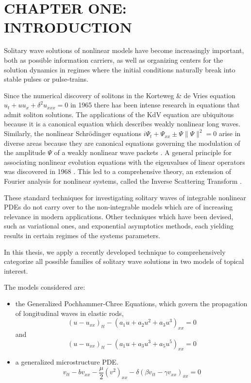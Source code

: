 \chapter{CHAPTER ONE: INTRODUCTION} \label{chapter_1}

Solitary wave solutions of nonlinear models have become increasingly
important, both as possible information carriers,
as well as organizing centers for the solution dynamics in regimes
where the initial conditions naturally break into stable pulses or
pulse-trains.

Since the numerical discovery of solitons in the Korteweg \& de Vries
equation $ u_t + u u_x + \delta^2 u_{xxx} = 0$ \cite{ZK} in 1965 there
has been intense research in equations that admit soliton solutions. 
The applications of the KdV equation are ubiquitous because it is a
canonical equation which describes weakly nonlinear long waves.
Similarly, the nonlinear Schr\"odinger equations $ i \Psi_t + \Psi_{xx} \pm \Psi\|\Psi\|^2 = 0 $
arise in diverse areas because they are canonical equations governing the 
modulation of the amplitude $\Psi$ of a weakly nonlinear wave packets \cite{DJ}.
A general principle for associating nonlinear evolution equations with the eigenvalues
of linear operators was discovered in 1968 \cite{Lax}. This led to a comprehensive
theory, an extension of Fourier analysis for nonlinear systems, called 
the Inverse Scattering Transform \cite{AKNS}.

These standard techniques for investigating solitary waves of
integrable nonlinear PDEs do not carry over to the
non-integrable models which are of increasing relevance in modern
applications. Other techniques which have been devised, such as
variational ones, and exponential asymptotics methods, each yielding
results in certain regimes of the systems parameters.

In this thesis, we apply a recently developed technique to
comprehensively categorize all possible families of solitary wave
solutions in two models of topical interest.

The models considered are:
\begin{itemize}
\item the Generalized Pochhammer-Chree Equations, which  govern the
propagation of longitudinal waves in elastic rods,
\begin{equation}\label{eq:GPC1}
\left( u - u_{xx} \right)_{tt} - \left( a_1 u + a_2 u^2 + a_3 u^3 \right)_{xx} =0  
\end{equation}
and
\begin{equation}  \label{eq:GPC2} 
\left( u - u_{xx} \right)_{tt} - \left( a_1 u + a_3 u^3 + a_5 u^5 \right)_{xx} =0
\end{equation}

\item a generalized microstructure PDE.
\begin{equation}\label{eq:MS}
v_{tt} - b v_{xx} - \frac{\mu}{2} \left( v^2 \right)_{xx} - \delta \left( \beta v_{tt} - \gamma v_{xx}\right)_{xx} = 0 
\end{equation}
\end{itemize}

